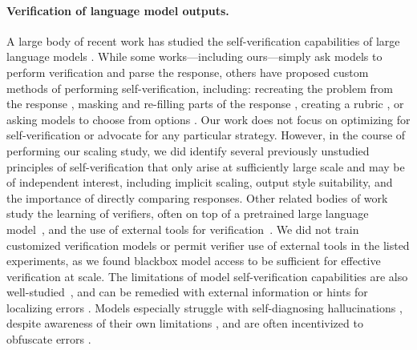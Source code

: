 \paragraph{Verification of language model outputs.}
A large body of recent work has studied the self-verification capabilities of large language models \citep[e.g.,][]{cobbe_training_2021,kadavath_language_2022,saunders_self-critiquing_2022,DBLP:conf/nips/KimBM23,DBLP:conf/nips/XieKZZKHX23,DBLP:conf/emnlp/WengZX0HLSLZ23,zhang_how_2023,xue_rcot_2023,li_making_2023,liu_large_2024,chow_inference-aware_2024,DBLP:conf/acl/JiangSYL0LK24,DBLP:conf/acl/DhuliawalaKXRLC24,snyder_early_2024,wu_large_2024,DBLP:conf/iclr/0009CMZYSZ24,kamoi_evaluating_2024,kamoi_when_2024,orgad_llms_2024,wen_language_2024,tyen_llms_2024,chen_simple_2024,kumar_training_2024,qu_recursive_2024,zhang_generative_2024,ko_real-time_2025,DBLP:conf/icml/HavrillaRNDZHR24}.
While some works---including ours---simply ask models to perform verification and parse the response, others have proposed custom methods of performing self-verification, including: recreating the problem from the response \citep{xue_rcot_2023,wu_large_2024}, masking and re-filling parts of the response \citep{DBLP:conf/emnlp/WengZX0HLSLZ23,DBLP:conf/acl/JiangSYL0LK24}, creating a rubric \citep{DBLP:conf/acl/DhuliawalaKXRLC24}, or asking models to choose from options \citep{DBLP:conf/nips/XieKZZKHX23,chen_simple_2024}.
Our work does not focus on optimizing for self-verification or advocate for any particular strategy.
However, in the course of performing our scaling study, we did identify several previously unstudied principles of self-verification that only arise at sufficiently large scale and may be of independent interest, including implicit scaling, output style suitability, and the importance of directly comparing responses.
Other related bodies of work study the learning of verifiers, often on top of a pretrained large language model~\citep[e.g.][]{cobbe_training_2021, saunders_self-critiquing_2022, li_making_2023, DBLP:conf/icml/HavrillaRNDZHR24, kumar_training_2024, qu_recursive_2024, chow_inference-aware_2024, zhang_generative_2024}, and the use of external tools for verification~\citep[e.g.][]{min_factscore_2023, gou_critic_2024, gao_embedding_2024,DBLP:conf/nips/KimBM23}.
We did not train customized verification models or permit verifier use of external tools in the listed experiments, as we found blackbox model access to be sufficient for effective verification at scale.
The limitations of model self-verification capabilities are also well-studied~\citep{kamoi_evaluating_2024, tyen_llms_2024, DBLP:conf/iclr/0009CMZYSZ24}, and can be remedied with external information \citep{DBLP:conf/iclr/0009CMZYSZ24} or hints for localizing errors \citep{tyen_llms_2024}.
Models especially struggle with self-diagnosing hallucinations \citep{zhang_how_2023,orgad_llms_2024,snyder_early_2024}, despite awareness of their own limitations \citep{kadavath_language_2022}, and are often incentivized to obfuscate errors \citep{wen_language_2024}.

